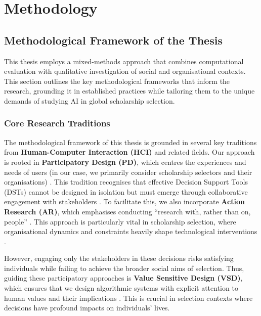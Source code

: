 \chapter{\label{ch:methods}Methodology}

\minitoc

\section{Methodological Framework of the Thesis}\label{sec:context_methodology}

This thesis employs a mixed-methods approach that combines computational evaluation with qualitative investigation of social and organisational contexts. This section outlines the key methodological frameworks that inform the research, grounding it in established practices while tailoring them to the unique demands of studying AI in global scholarship selection.

\subsection{Core Research Traditions}\label{ssec:context_core_traditions}
The methodological framework of this thesis is grounded in several key traditions from \textbf{Human-Computer Interaction (HCI)} and related fields. Our approach is rooted in \textbf{Participatory Design (PD)}, which centres the experiences and needs of users (in our case, we primarily consider scholarship selectors and their organisations) \cite{blythe2014research, Knapp_Zeratzky_Kowitz_2016}. This tradition recognises that effective Decision Support Tools (DSTs) cannot be designed in isolation but must emerge through collaborative engagement with stakeholders \cite{braun_using_2006}. To facilitate this, we also incorporate \textbf{Action Research (AR)}, which emphasises conducting ``research with, rather than on, people'' \cite{Hayes_2011, bradbury_action_2003}. This approach is particularly vital in scholarship selection, where organisational dynamics and constraints heavily shape technological interventions \cite{lu_organizing_2023}.

However, engaging only the stakeholders in these decisions risks satisfying individuals while failing to achieve the broader social aims of selection. Thus, guiding these participatory approaches is \textbf{Value Sensitive Design (VSD)}, which ensures that we design algorithmic systems with explicit attention to human values and their implications \cite{VanKleek_Seymour_Binns_Shadbolt_2018}. This is crucial in selection contexts where decisions have profound impacts on individuals' lives.

